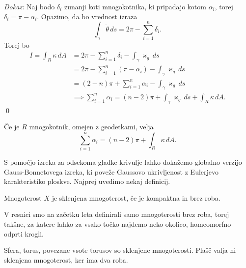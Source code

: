 \noindent
{\em Dokaz:\/}
Naj bodo $\delta_i$ zunanji koti mnogokotnika, ki pripadajo kotom $\alpha_i$, torej $\delta_i = \pi - \alpha_i$. Opazimo, da bo vrednost izraza \begin{equation*}
    \int_{\gamma} \dot{\theta}  \, ds = 2 \pi - \sum_{i = 1}^{n} \delta_i.
\end{equation*}  
Torej bo \begin{align*}
    I = \int_{R} \kappa  \, dA &= 2 \pi  - \sum_{i = 1}^{n} \delta_i - \int_{\gamma} \varkappa_g  \, ds   \\
     &= 2 \pi- \sum_{i =1}^{n} (\pi - \alpha_i) - \int_{\gamma} \varkappa_g \, ds \\
    &= (2 - n)\pi + \sum_{i = 1}^{n} \alpha_i - \int_{\gamma} \varkappa_g \, ds \\
    &\implies \sum_{i = 1}^{n} \alpha_i = (n - 2)\pi + \int_{\gamma} \varkappa_g \, ds + \int_{R} \kappa \, dA.
\end{align*}  
\qed
\begin{posledica}
    \label{psl_posledica_globalnega_GB_izreka}
    Če je $R$ mnogokotnik, omejen z  geodetkami, velja \begin{equation*}
        \sum_{i=1}^{n} \alpha_i = (n-2) \pi  + \int_{R} \kappa \, dA. 
    \end{equation*}  
    \end{posledica}
S pomočjo izreka za odsekoma gladke krivulje lahko dokažemo globalno verzijo Gauss-Bonnetovega izreka, ki poveže Gaussovo ukrivljenost z Eulerjevo karakteristiko ploskve. Najprej uvedimo nekaj definicij.

\begin{definicija}
\label{def_sklenjena_mnogoterost}
Mnogoterost $X$ je sklenjena mnogoterost, če je kompaktna in brez roba.
\end{definicija}

\begin{opomba}
V resnici smo na začetku leta definirali samo mnogoterosti brez roba, torej takšne, za katere lahko za vsako točko najdemo neko okolico, homeomorfno odprti krogli.
\end{opomba}

\begin{primer}
Sfera, torus, povezane vsote torusov so sklenjene mnogoterosti. Plašč valja ni sklenjena mnogoterost, ker ima dva roba. 
\end{primer}


